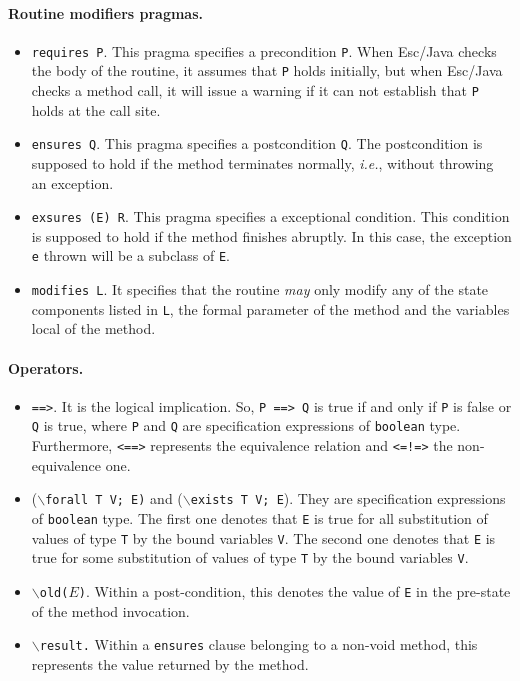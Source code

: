 \documentclass[a4paper]{llncs}
\begin{document}
\paragraph{\bf Routine modifiers pragmas.}
\begin{itemize}
\item{\texttt{requires P}.}
This pragma specifies a precondition {\tt P}.
When Esc/Java checks the body of the
routine, it assumes that \texttt{P} holds initially, but when
Esc/Java checks a method call, it will issue a warning if
it can not establish that \texttt{P} holds at the call site.

\item{\texttt{ensures Q}.}
This pragma specifies a postcondition \texttt{Q}. The postcondition 
is supposed to hold if the method terminates normally, \emph{i.e.},
without throwing an exception.

\item{\texttt{exsures (E) R}.}
This pragma specifies a exceptional condition. This condition is
supposed to hold if the method finishes abruptly. In this case,
the exception \texttt{e} thrown will be a subclass of \texttt{E}.

\item{\texttt{modifies L}.}
It specifies that the routine \emph{may} only modify any of
the state components listed in \texttt{L}, the formal parameter of
the method and the variables local of the method.
\end{itemize}



\paragraph{\bf Operators.}
\begin{itemize}
\item{\texttt{==>}.} It is the logical implication. So, \texttt{P
==> Q} is true if and only if \texttt{P} is false or \texttt{Q} is
true, where \texttt{P} and \texttt{Q} are specification expressions of 
\texttt{boolean} type. Furthermore, \texttt{<==>} represents the
equivalence relation and \texttt{<=!=>} the non-equivalence one.

\item {($\backslash$\texttt{forall T V; E)} and
($\backslash$\texttt{exists T V; E}).}
They are specification expressions of \texttt{boolean} type. The first one
denotes that \texttt{E} is true for all substitution of values
of type \texttt{T} by the bound variables \texttt{V}. The second one
denotes that \texttt{E} is true for some substitution of values of
type \texttt{T} by the bound variables \texttt{V}.

\item{\texttt{$\backslash$old($E$)}.} Within a post-condition, this denotes
the value of \texttt{E} in the pre-state of the method invocation. 

\item {\tt$\backslash$result.} Within a \texttt{ensures} clause
belonging to a non-void method, this represents the value returned by
the method.

\end{itemize}
\end{document}
